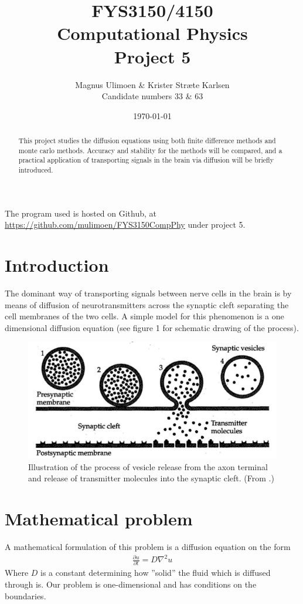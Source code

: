 \documentclass[11pt,a4paper,draft]{article}
\title{FYS3150/4150\\Computational Physics\\Project 5}
\author{Magnus Ulimoen \& Krister Stræte Karlsen\\
Candidate numbers 33 \& 63}
\date{\today}
\numberwithin{equation}{section}
\begin{document}
\maketitle

\begin{abstract}
This project studies the diffusion equations using both finite difference methods and monte carlo methods. Accuracy and stability for the methods will be compared, and a practical application of transporting signals in the brain via diffusion will be briefly introduced. 
\end{abstract}

The program used is hosted on Github, at 
\url{https://github.com/mulimoen/FYS3150CompPhy} under project 5.

\section{Introduction}
The dominant way of transporting signals between nerve cells in the brain is by means of diffusion of neurotransmitters across the synaptic cleft separating the cell membranes of the two cells. A simple model for this phenomenon is a one dimensional diffusion equation (see figure 1 for schematic drawing of the process). 

\begin{figure}[H]
\centering
\includegraphics[scale=0.15]{fig1.png}
\caption{Illustration of the process of vesicle release from the axon
terminal and release of transmitter molecules into the synaptic cleft.
(From \cite{thompson2000brain}.)}
\label{fig:spin_neighbours_full}
\end{figure}

\section{Mathematical problem}
A mathematical formulation of this problem is a diffusion equation on the form
\begin{gather}
\frac{\partial u}{\partial t} = D\nabla^2u
\end{gather}
Where $D$ is a constant determining how ''solid'' the fluid which is 
diffused through is. Our problem is one-dimensional and has conditions on 
the boundaries.
\end{document}
